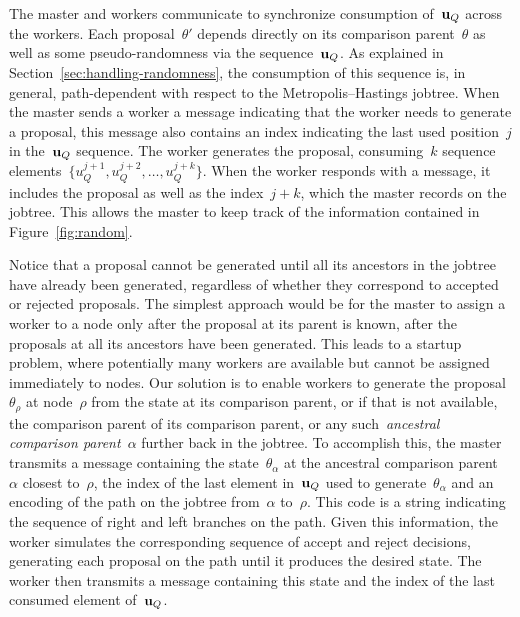 \documentclass[angelino.tex]{subfiles}
\begin{document}
The master and workers communicate to synchronize consumption of~$\mathbf{u}_Q$
across the workers.
%
Each proposal~$\theta'$ depends directly on its comparison parent~$\theta$
as well as some pseudo-randomness via the sequence~$\mathbf{u}_Q$.
%
As explained in Section~\ref{sec:handling-randomness}, the consumption of this
sequence is, in general, path-dependent with respect to the Metropolis--Hastings jobtree.
%
When the master sends a worker a \HAVEWORK message indicating that the
worker needs to generate a proposal, this message also contains an index
indicating the last used position~$j$ in the~$\mathbf{u}_Q$ sequence.
%
The worker generates the proposal, consuming~$k$ sequence elements~${\{u_Q^{j+1}, u_Q^{j+2}, \dots, u_Q^{j+k}\}}$.
%
When the worker responds with a \SETPROPOSAL message, it includes the proposal
as well as the index~${j+k}$, which the master records on the jobtree.
%
This allows the master to keep track of the information contained in
Figure~\ref{fig:random}.


Notice that a proposal cannot be generated until all its ancestors in the
jobtree have already been generated, regardless of whether they correspond to
accepted or rejected proposals.
%
The simplest approach would be for the master to assign a worker to a node
only after the proposal at its parent is known, \ie after the proposals at all
its ancestors have been generated.
%
This leads to a startup problem, where potentially many workers are available
but cannot be assigned immediately to nodes.
%
Our solution is to enable workers to generate the proposal~$\theta_\rho$
at node~$\rho$ from the state at its comparison parent,
or if that is not available, the comparison parent of its comparison parent,
or any such~\emph{ancestral comparison parent}~$\alpha$ further back in the jobtree.
%
To accomplish this, the master transmits a \HAVEWORK message containing the
state~$\theta_\alpha$ at the ancestral comparison parent~$\alpha$ closest to~$\rho$,
the index of the last element in~$\mathbf{u}_Q$ used to generate~$\theta_\alpha$
and an encoding of the path on the jobtree from~$\alpha$ to~$\rho$.
%
This code is a string indicating the sequence of right and left branches on the path.
%
Given this information, the worker simulates the corresponding sequence of
accept and reject decisions, generating each proposal on the path until it
produces the desired state.
%
The worker then transmits a \SETPROPOSAL message containing this state and
the index of the last consumed element of~$\mathbf{u}_Q$.


%
\end{document}
